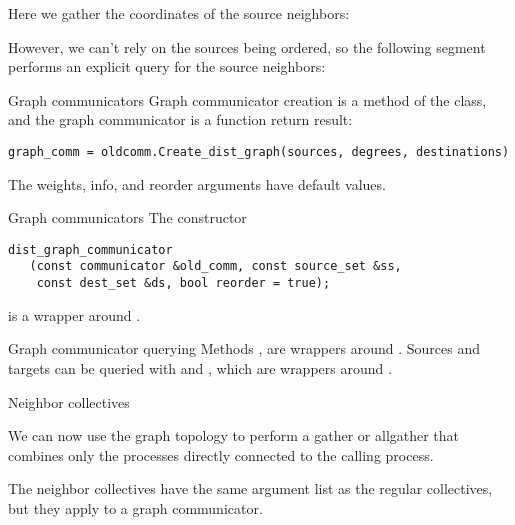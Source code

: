 Here we gather the coordinates of the source neighbors:

{
  \def\snippetcodefraction{.45}
  \def\snippetlistfraction{.5} 
}

However, we can't rely on the sources being ordered,
so the following segment performs an explicit query for the
source neighbors:

{
  \def\snippetcodefraction{.45}
  \def\snippetlistfraction{.5} 
}

\begin{pythonnote}{Graph communicators}
  Graph communicator creation is a method of the  class,
  and the graph communicator is a function return result:
\begin{lstlisting}
graph_comm = oldcomm.Create_dist_graph(sources, degrees, destinations)
\end{lstlisting}
  The weights, info, and reorder arguments have default values.
\end{pythonnote}

\begin{mplnote}{Graph communicators}
  \label{mpl:graph-comm}
  The constructor 
\begin{lstlisting}
dist_graph_communicator
   (const communicator &old_comm, const source_set &ss,
    const dest_set &ds, bool reorder = true);    
\end{lstlisting}
is a wrapper around .
\end{mplnote}
\begin{mplnote}{Graph communicator querying}
  \label{mpl:graph-query}
  Methods , 
  are wrappers around .
  Sources and targets can be queried with
   and ,
  which are wrappers around .
\end{mplnote}

 {Neighbor collectives}
\label{sec:mpi-neigh-coll}

We can now use the graph topology to perform a gather or allgather
that combines only the processes directly connected to the calling
process.

The neighbor collectives have the same argument list as the regular
collectives, but they apply to a graph communicator.

